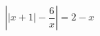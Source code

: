 \begin{ex}[type=equation]
	\begin{condition}
		$\left|\big | x +1\big|-\dfrac{6}{x}\right| = 2- x$
	\end{condition}
\end{ex}